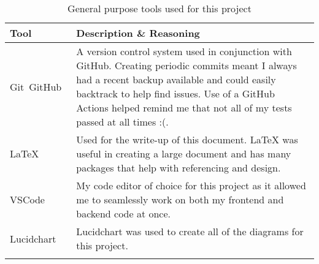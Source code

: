 \begin{longtable}{p{} p{}}
  \toprule
  \textbf{Tool} & \textbf{Description \& Reasoning}
  \\\midrule\midrule
  Git~\cite{noauthor_git_nodate}\newline GitHub~\cite{noauthor_github_nodate}
  & A version control system used in conjunction with GitHub. Creating periodic commits meant I always had a recent backup available and could easily backtrack to help find issues.
  Use of a GitHub Actions helped remind me that not all of my tests passed at all times :(.\\
  LaTeX~\cite{noauthor_latex_nodate}
  & Used for the write-up of this document. LaTeX was useful in creating a large document and has many packages that help with referencing and design.\\
  VSCode~\cite{noauthor_visual_nodate}
  & My code editor of choice for this project as it allowed me to seamlessly work on both my frontend and backend code at once.\\
  Lucidchart~\cite{noauthor_lucidchart_nodate}
  & Lucidchart was used to create all of the diagrams for this project.
  \\\bottomrule\bottomrule
  \caption{General purpose tools used for this project}
  \label{tab:tools-other}
\end{longtable}
